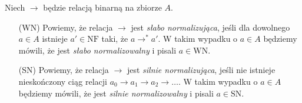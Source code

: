 \begin{definicja}
  Niech \(\to\) będzie relacją binarną na zbiorze \(A\). 
\begin{enumerate}
  \setlength\itemsep{0em}
  \item[(WN) ] Powiemy, że relacja \(\to\) jest \emph{słabo normalizująca}, jeśli
    dla dowolnego \(a\in A\) istnieje \(a'\in \mathrm{NF}\) taki, że \(a\to^{*} a'\). W takim wypadku o \(a\in A\) będziemy mówili, że jest \emph{słabo normalizowalny} i pisali \(a\in \mathrm{WN}\).
  \item[(SN)] Powiemy, że relacja \(\to\) jest \emph{silnie normalizująca}, jeśli nie istnieje nieskończony ciąg relacji \(a_0 \to a_1 \to a_2 \to \dots\). W takim wypadku o \(a\in A\) będziemy mówili, że jest \emph{silnie normalizowalny} i pisali \(a\in \mathrm{SN}\).

\end{enumerate}
\end{definicja}

